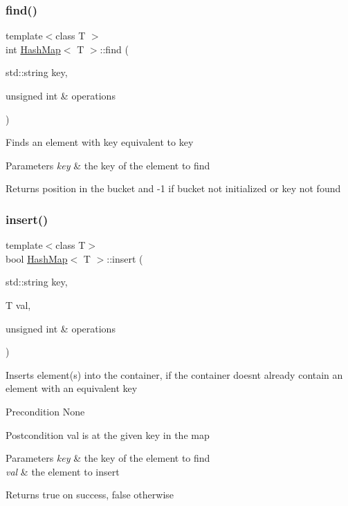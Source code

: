 \subsubsection{\texorpdfstring{find()}{find()}}
{\footnotesize\ttfamily template$<$class T $>$ \\
int \hyperlink{class_hash_map}{Hash\+Map}$<$ T $>$\+::find (\begin{DoxyParamCaption}\item[{std\+::string}]{key,  }\item[{unsigned int \&}]{operations }\end{DoxyParamCaption})}

Finds an element with key equivalent to key 
\begin{DoxyParams}{Parameters}
{\em key} & the key of the element to find \\
\hline
\end{DoxyParams}
\begin{DoxyReturn}{Returns}
position in the bucket and -\/1 if bucket not initialized or key not found 
\end{DoxyReturn}
\mbox{\label{class_hash_map_a65e981d68fae1496f1309b0a3c0a1df5}} 
\subsubsection{\texorpdfstring{insert()}{insert()}}
{\footnotesize\ttfamily template$<$class T$>$ \\
bool \hyperlink{class_hash_map}{Hash\+Map}$<$ T $>$\+::insert (\begin{DoxyParamCaption}\item[{std\+::string}]{key,  }\item[{T}]{val,  }\item[{unsigned int \&}]{operations }\end{DoxyParamCaption})}

Inserts element(s) into the container, if the container doesn\textquotesingle{}t already contain an element with an equivalent key \begin{DoxyPrecond}{Precondition}
None 
\end{DoxyPrecond}
\begin{DoxyPostcond}{Postcondition}
val is at the given key in the map 
\end{DoxyPostcond}

\begin{DoxyParams}{Parameters}
{\em key} & the key of the element to find \\
\hline
{\em val} & the element to insert \\
\hline
\end{DoxyParams}
\begin{DoxyReturn}{Returns}
true on success, false otherwise 
\end{DoxyReturn}
\mbox{\label{class_hash_map_a9a9025b541de8b5b3b83736ba0f59ce2}} 
